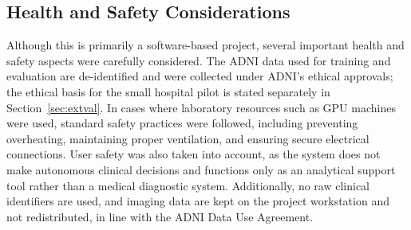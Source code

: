\subsection{Health and Safety Considerations}
Although this is primarily a software-based project, several important health and safety aspects were carefully considered. The ADNI data used for training and evaluation are de-identified and were collected under ADNI's ethical approvals; the ethical basis for the small hospital pilot is stated separately in Section~\ref{sec:extval}. In cases where laboratory resources such as GPU machines were used, standard safety practices were followed, including preventing overheating, maintaining proper ventilation, and ensuring secure electrical connections. User safety was also taken into account, as the system does not make autonomous clinical decisions and functions only as an analytical support tool rather than a medical diagnostic system. Additionally, no raw clinical identifiers are used, and imaging data are kept on the project workstation and not redistributed, in line with the ADNI Data Use Agreement.

